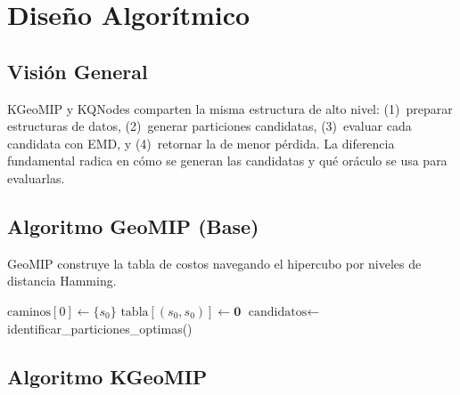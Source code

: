 \section{Diseño Algorítmico}
\label{sec:disenio}

\subsection{Visión General}

KGeoMIP y KQNodes comparten la misma estructura de alto nivel: (1)~preparar estructuras de datos, (2)~generar particiones candidatas, (3)~evaluar cada candidata con EMD, y (4)~retornar la de menor pérdida. La diferencia fundamental radica en cómo se generan las candidatas y qué oráculo se usa para evaluarlas.

\subsection{Algoritmo GeoMIP (Base)}

GeoMIP construye la tabla de costos navegando el hipercubo por niveles de distancia Hamming.

\begin{algorithm}[H]
\DontPrintSemicolon
{}
\BlankLine
$\text{caminos}[0] \leftarrow \{s_0\}$\;
$\text{tabla}[(s_0,s_0)] \leftarrow \mathbf{0}$\;
$\text{candidatos} \leftarrow$ identificar\_particiones\_optimas()\;
\;
\caption{GeoMIP: búsqueda geométrico-topológica del bi-MIP.}
\label{alg:geomip}
\end{algorithm}

\subsection{Algoritmo KGeoMIP}

